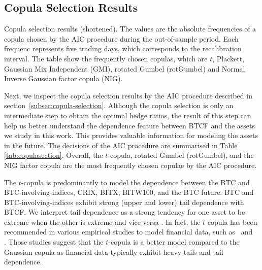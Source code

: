 \subsection{Copula Selection Results}\label{subsec:-copula-results}
\begin{table}[t]

 \caption{Copula selection results (shortened).
        The values are the absolute frequencies of a copula chosen by
        the AIC procedure during the out-of-sample period. 
        Each frequenc represents five trading days, which corresponds
        to the recalibration interval.
        The table show the frequently chosen copulas, which are
        $t$, Plackett, Gaussian Mix Independent (GMI), rotated Gumbel
        (rotGumbel) and Normal Inverse Gaussian factor copula (NIG). 
        }
    \label{tab:copulasection}
\end{table}
Next, we inspect the copula selection results by the AIC procedure
described in section~\ref{subsec:copula-selection}. 
Although the copula selection is only an intermediate step to obtain
the optimal hedge ratios,
the result of this step can help us better understand the dependence
feature between BTCF and the assets we study in this work.
This provides valuable information for modeling the assets in the future.
The decisions of the AIC procedure are summarised in Table
\ref{tab:copulasection}. Overall, the $t$-copula, rotated Gumbel
(rotGumbel), and the NIG factor copula are the most frequently chosen
copulae by the AIC procedure.

The $t$-copula is predominantly to model the dependence between 
the BTC and BTC-involving-indices, CRIX, BITX, BITW100, and the BTC
future.
BTC and BTC-involving-indices exhibit strong (upper and lower) tail
dependence with BTCF.  We interpret tail dependence as a strong
tendency for one asset to be extreme when the other is extreme and
vice versa \citep{McNeil2015}.
In fact, the $t$ copula has been recommended in various empirical
studies to model financial data, such as~\cite{zeevi2002beyond} and~
\cite{breymann2003dependence}.
Those studies suggest that the $t$-copula is a better model compared
to the Gaussian copula as financial data typically exhibit heavy tails
and tail dependence. 

